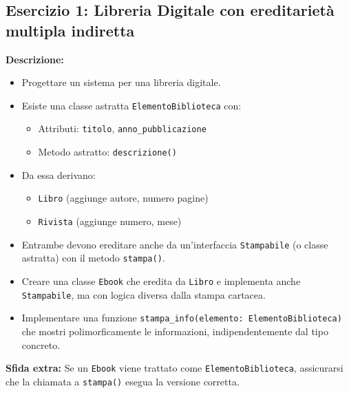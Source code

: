 \documentclass{article}
\begin{document}
\subsection*{Esercizio 1: Libreria Digitale con ereditarietà multipla indiretta}
\textbf{Descrizione:}
\begin{itemize}
    \item Progettare un sistema per una libreria digitale.
    \item Esiste una classe astratta \texttt{ElementoBiblioteca} con:
    \begin{itemize}
        \item Attributi: \texttt{titolo}, \texttt{anno\_pubblicazione}
        \item Metodo astratto: \texttt{descrizione()}
    \end{itemize}
    \item Da essa derivano:
    \begin{itemize}
        \item \texttt{Libro} (aggiunge autore, numero pagine)
        \item \texttt{Rivista} (aggiunge numero, mese)
    \end{itemize}
    \item Entrambe devono ereditare anche da un'interfaccia \texttt{Stampabile} (o classe astratta) con il metodo \texttt{stampa()}.
    \item Creare una classe \texttt{Ebook} che eredita da \texttt{Libro} e implementa anche \texttt{Stampabile}, ma con logica diversa dalla stampa cartacea.
    \item Implementare una funzione \texttt{stampa\_info(elemento: ElementoBiblioteca)} che mostri polimorficamente le informazioni, indipendentemente dal tipo concreto.
\end{itemize}

\textbf{Sfida extra:}  
Se un \texttt{Ebook} viene trattato come \texttt{ElementoBiblioteca}, assicurarsi che la chiamata a \texttt{stampa()} esegua la versione corretta.
\end{document}
